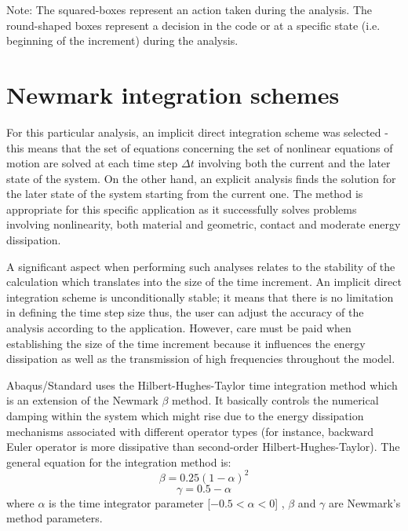 \documentclass[10pt,a4paper]{report}
\begin{document}
\vspace*{3cm}
Note: The squared-boxes represent an action taken during the analysis. The round-shaped boxes represent a decision in the code or at a specific state (i.e. beginning of the increment) during the analysis.

\newpage
\chapter{Newmark integration schemes} \label{App:AppendixH}

For this particular analysis, an implicit direct integration scheme was selected - this means that the set of equations concerning the set of nonlinear equations of motion are solved at each time step $\Delta t$ involving both the current and the later state of the system. On the other hand, an explicit analysis finds the solution for the later state of the system starting from the current one. The method is appropriate for this specific application as it successfully solves problems involving nonlinearity, both material and geometric, contact and moderate energy dissipation. 

A significant aspect when performing such analyses relates to the stability of the calculation which translates into the size of the time increment. An implicit direct integration scheme is unconditionally stable; it means that there is no limitation in defining the time step size thus, the user can adjust the accuracy of the analysis according to the application. However, care must be paid when establishing the size of the time increment because it influences the energy dissipation as well as the transmission of high frequencies throughout the model.

Abaqus/Standard uses the Hilbert-Hughes-Taylor time integration method which is an extension of the Newmark $\beta$ method. It basically controls the numerical damping within the system which might rise due to the energy dissipation mechanisms associated with different operator types (for instance, backward Euler operator is more dissipative than second-order Hilbert-Hughes-Taylor). The general equation for the integration method is:
\begin{equation}
	\beta=0.25(1-\alpha)^2
\end{equation}
\begin{equation}
	\gamma= 0.5-\alpha
\end{equation}
where $\alpha$ is the time integrator parameter [$-0.5<\alpha<0$] , $\beta$ and $\gamma$ are Newmark's method parameters.
\end{document}
